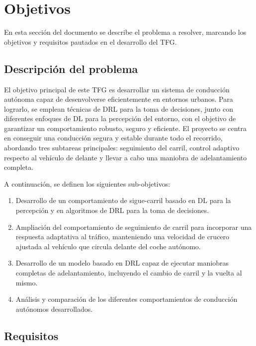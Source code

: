 \chapter{Objetivos}
\label{cap:capitulo2}

En esta sección del documento se describe el problema a resolver, marcando los objetivos y requisitos pautados en el desarrollo del \ac{TFG}.

\section{Descripción del problema}
\label{sec:descripcion}

El objetivo principal de este \ac{TFG} es desarrollar un sistema de conducción autónoma capaz de desenvolverse eficientemente en entornos urbanos. Para lograrlo, se emplean técnicas de \ac{DRL} para la toma de decisiones, junto con diferentes enfoques de \ac{DL} para la percepción del entorno, con el objetivo de garantizar un comportamiento robusto, seguro y eficiente. El proyecto se centra en conseguir una conducción segura y estable durante todo el recorrido, abordando tres subtareas principales: seguimiento del carril, control adaptivo respecto al vehículo de delante y llevar a cabo una maniobra de adelantamiento completa.

A continuación, se definen los siguientes sub-objetivos: 

\begin{enumerate}
\item Desarrollo de un comportamiento de sigue-carril basado en \ac{DL} para la percepción y en algoritmos de \ac{DRL} para la toma de decisiones.
\item Ampliación del comportamiento de seguimiento de carril para incorporar una respuesta adaptativa al tráfico, manteniendo una velocidad de crucero ajustada al vehículo que circula delante del coche autónomo.
\item Desarrollo de un modelo basado en \ac{DRL} capaz de ejecutar maniobras completas de adelantamiento, incluyendo el cambio de carril y la vuelta al mismo.
\item Análisis y comparación de los diferentes comportamientos de conducción autónomos desarrollados.
\end{enumerate}

\section{Requisitos}
\label{sec:requisitos}

